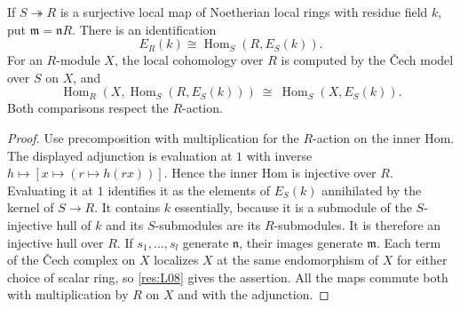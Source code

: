 \begin{lemma}\label{res:D04}
If $S\twoheadrightarrow R$ is a surjective local map of Noetherian
local rings with residue field $k$, put $\mathfrak m=\mathfrak nR$.
There is an identification
\[
 E_R(k)\cong\operatorname{Hom}_S(R,E_S(k)).
\]
For an $R$-module $X$, the local cohomology over $R$ is computed by
the \v{C}ech model over $S$ on $X$, and
\[
 \operatorname{Hom}_R(X,\operatorname{Hom}_S(R,E_S(k)))
   \ \cong\ \operatorname{Hom}_S(X,E_S(k)).
\]
Both comparisons respect the $R$-action.
\end{lemma}
\begin{proof}
Use precomposition with multiplication for the $R$-action on the
inner Hom. The displayed adjunction is evaluation at $1$ with
inverse $h\mapsto [x\mapsto (r\mapsto h(rx))]$. Hence the inner Hom
is injective over $R$. Evaluating it at $1$ identifies it as the
elements of $E_S(k)$ annihilated by the kernel of $S\to R$.
It contains $k$ essentially, because it is a submodule of the
$S$-injective hull of $k$ and its $S$-submodules are its
$R$-submodules. It is therefore an injective hull over $R$.
If $s_1,\ldots,s_l$ generate $\mathfrak n$, their images generate
$\mathfrak m$. Each term of the \v{C}ech complex on $X$
localizes $X$ at the same endomorphism of $X$ for either choice
of scalar ring, so \ref{res:L08} gives the assertion. All the
maps commute both with multiplication by $R$ on $X$ and with
the adjunction.
\end{proof}

